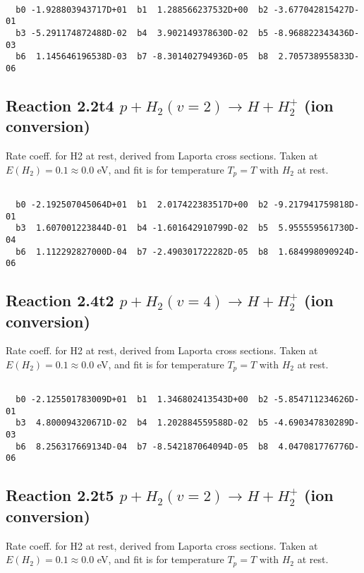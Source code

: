 \begin{small}\begin{verbatim}

  b0 -1.928803943717D+01  b1  1.288566237532D+00  b2 -3.677042815427D-01
  b3 -5.291174872488D-02  b4  3.902149378630D-02  b5 -8.968822343436D-03
  b6  1.145646196538D-03  b7 -8.301402794936D-05  b8  2.705738955833D-06

\end{verbatim}\end{small}

\newpage
\subsection{
Reaction 2.2t4
$ p + H_2(v=2) \rightarrow H + H_2^+$ (ion conversion)
}
Rate coeff. for H2 at rest, derived from Laporta cross sections.
Taken at $E(H_2) = 0.1 \approx 0.0$ eV,  and fit is for temperature $T_p=T$ with $H_2$ at rest.

\begin{small}\begin{verbatim}

  b0 -2.192507045064D+01  b1  2.017422383517D+00  b2 -9.217941759818D-01
  b3  1.607001223844D-01  b4 -1.601642910799D-02  b5  5.955559561730D-04
  b6  1.112292827000D-04  b7 -2.490301722282D-05  b8  1.684998090924D-06

\end{verbatim}\end{small}

\newpage
\subsection{
Reaction 2.4t2
$ p + H_2(v=4) \rightarrow H + H_2^+$ (ion conversion)
}
Rate coeff. for H2 at rest, derived from Laporta cross sections.
Taken at $E(H_2) = 0.1 \approx 0.0$ eV,  and fit is for temperature $T_p=T$ with $H_2$ at rest.

\begin{small}\begin{verbatim}

  b0 -2.125501783009D+01  b1  1.346802413543D+00  b2 -5.854711234626D-01
  b3  4.800094320671D-02  b4  1.202884559588D-02  b5 -4.690347830289D-03
  b6  8.256317669134D-04  b7 -8.542187064094D-05  b8  4.047081776776D-06

\end{verbatim}\end{small}

\newpage
\subsection{
Reaction 2.2t5
$ p + H_2(v=2) \rightarrow H + H_2^+$ (ion conversion)
}
Rate coeff. for H2 at rest, derived from Laporta cross sections.
Taken at $E(H_2) = 0.1 \approx 0.0$ eV,  and fit is for temperature $T_p=T$ with $H_2$ at rest.

